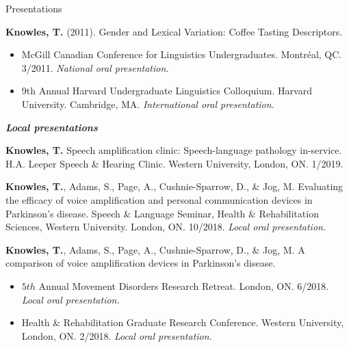 \documentclass{resume} %
\begin{document}
\begin{rSection}{Presentations}
\begin{etaremune}
\item {\bf Knowles, T.} (2011). Gender and Lexical Variation: Coffee Tasting Descriptors. 
	\begin{itemize}
				\renewcommand\labelitemi{$\cdot$}
		\item McGill Canadian Conference for Linguistics Undergraduates. Montr\'eal, QC. 3/2011. \emph{National oral presentation.}
		\item 9th Annual Harvard Undergraduate Linguistics Colloquium. Harvard University. Cambridge, MA. \emph{International oral presentation.}
	\end{itemize}

\end{etaremune}




\begin{center}
	{\bf \emph{Local presentations}}
\end{center}

\begin{etaremune}

\item {\bf Knowles, T.} Speech amplification clinic: Speech-language pathology in-service. H.A. Leeper Speech \& Hearing Clinic. Western University, London, ON. 1/2019.

\item {\bf Knowles, T.}, Adams, S., Page, A., Cushnie-Sparrow, D., \& Jog, M. Evaluating the efficacy of voice amplification and personal communication devices in Parkinson's disease. Speech \& Language Seminar, Health \& Rehabilitation Sciences, Western University. London, ON. 10/2018. \emph{Local oral presentation.}

\item {\bf Knowles, T.}, Adams, S., Page, A., Cushnie-Sparrow, D., \& Jog, M. A comparison of voice amplification devices in Parkinson's disease. 
		\begin{itemize}
			\renewcommand\labelitemi{$\cdot$}
			\item $5th$ Annual Movement Disorders Research Retreat. London, ON. 6/2018. \emph{Local oral presentation.}
			\item Health \& Rehabilitation  Graduate Research Conference. Western University, London, ON. 2/2018. \emph{Local oral presentation.}
		\end{itemize}
		

\end{etaremune}
\end{rSection}
\end{document}
